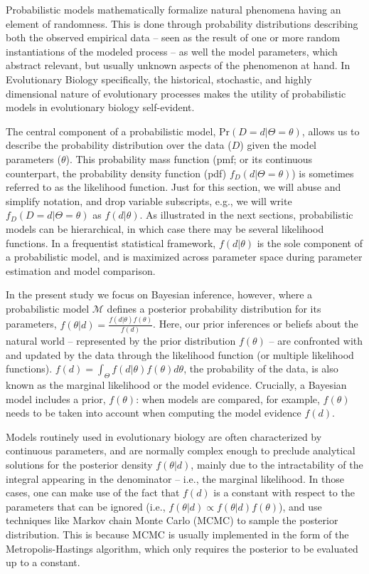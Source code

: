 \documentclass[oneside]{article}
\begin{document}
Probabilistic models mathematically formalize natural phenomena
having an element of randomness.
This is done through probability distributions describing both the observed
empirical data -- seen as the result of one or more random instantiations of the modeled process -- as well the model parameters, which abstract relevant, but usually unknown aspects of the phenomenon at hand.
In Evolutionary Biology specifically, the historical, stochastic, and highly dimensional nature of evolutionary processes makes the utility of probabilistic models in evolutionary biology self-evident. 

The central component of a probabilistic model, $\text{Pr}(D=d|\Theta=\theta)$, allows us to describe the probability distribution over the data ($D$) given the model parameters ($\theta$).
This probability mass function (pmf; or its continuous counterpart, the probability density function (pdf) $f_D(d|\Theta=\theta)$) is sometimes referred to as the likelihood function.
Just for this section, we will abuse and simplify notation, and drop variable subscripts, e.g., we will write $f_D(D=d|\Theta=\theta)$  as $f(d|\theta)$.
As illustrated in the next sections, probabilistic models can be hierarchical, in which case there may be several likelihood functions.
In a frequentist statistical framework, $f(d|\theta)$ is the sole component of a probabilistic model, and is maximized across parameter space during parameter estimation and model comparison.

In the present study we focus on Bayesian inference, however, where a probabilistic model $\mathcal{M}$ defines a posterior  probability distribution for its parameters, $f(\theta|d) = \frac{f(d|\theta)f(\theta)}{f(d)}$.
Here, our prior inferences or beliefs about the natural world -- represented by the prior distribution $f(\theta)$ -- are confronted with and updated by the data through the likelihood function (or multiple likelihood functions).
$f(d) = \int_\Theta f(d|\theta)f(\theta)d\theta$, the probability of the data, is also known as the marginal likelihood or the model evidence.
Crucially, a Bayesian model includes a prior, $f(\theta)$: when models are compared, for example, $f(\theta)$ needs to be taken into account when computing the model evidence $f(d)$.

Models routinely used in evolutionary biology are often characterized by continuous parameters, and are normally complex enough to preclude analytical solutions for the posterior density $f(\theta|d)$, mainly due to the intractability of the integral appearing in the denominator -- i.e., the marginal likelihood.
In those cases, one can make use of the fact that $f(d)$ is a constant with respect to the parameters that can be ignored (i.e., $f(\theta|d) \propto f(\theta|d)f(\theta)$), and use techniques like Markov chain Monte Carlo (MCMC) to sample the posterior distribution.
This is because MCMC is usually implemented in the form of the Metropolis-Hastings \citep{metropolis53,mh} algorithm, which only requires the posterior to be evaluated up to a constant.
\end{document}
